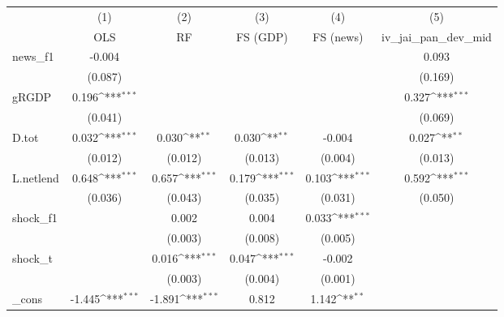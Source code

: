 {
\def\sym#1{\ifmmode^{#1}\else\(^{#1}\)\fi}
\begin{tabular}{l*{5}{c}}
\toprule
            &\multicolumn{1}{c}{(1)}&\multicolumn{1}{c}{(2)}&\multicolumn{1}{c}{(3)}&\multicolumn{1}{c}{(4)}&\multicolumn{1}{c}{(5)}\\
            &\multicolumn{1}{c}{OLS}&\multicolumn{1}{c}{RF}&\multicolumn{1}{c}{FS (GDP)}&\multicolumn{1}{c}{FS (news)}&\multicolumn{1}{c}{iv\_jai\_pan\_dev\_mid}\\
\midrule
news\_f1     &      -0.004         &                     &                     &                     &       0.093         \\
            &     (0.087)         &                     &                     &                     &     (0.169)         \\
\addlinespace
gRGDP       &       0.196\sym{***}&                     &                     &                     &       0.327\sym{***}\\
            &     (0.041)         &                     &                     &                     &     (0.069)         \\
\addlinespace
D.tot       &       0.032\sym{***}&       0.030\sym{**} &       0.030\sym{**} &      -0.004         &       0.027\sym{**} \\
            &     (0.012)         &     (0.012)         &     (0.013)         &     (0.004)         &     (0.013)         \\
\addlinespace
L.netlend   &       0.648\sym{***}&       0.657\sym{***}&       0.179\sym{***}&       0.103\sym{***}&       0.592\sym{***}\\
            &     (0.036)         &     (0.043)         &     (0.035)         &     (0.031)         &     (0.050)         \\
\addlinespace
shock\_f1    &                     &       0.002         &       0.004         &       0.033\sym{***}&                     \\
            &                     &     (0.003)         &     (0.008)         &     (0.005)         &                     \\
\addlinespace
shock\_t     &                     &       0.016\sym{***}&       0.047\sym{***}&      -0.002         &                     \\
            &                     &     (0.003)         &     (0.004)         &     (0.001)         &                     \\
\addlinespace
\_cons      &      -1.445\sym{***}&      -1.891\sym{***}&       0.812         &       1.142\sym{**} &                     \\

\end{tabular}}
